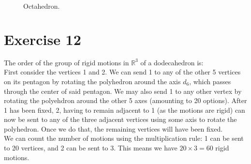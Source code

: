 \documentclass[12pt]{article}
\newcommand{\R}{\mathbb{R}}
\begin{document}
\begin{figure}[H]

        \caption{\label{fig:figure1} Octahedron.}
    \end{figure}


    \section*{Exercise 12}
    The order of the group of rigid motions in $\R^3$ of a dodecahedron is: \\
    First consider the vertices 1 and 2.
    We can send 1 to any of the other 5 vertices on its pentagon by
    rotating the polyhedron around the axis $d_6$, which passes through
    the center of said pentagon. We may also send 1 to any other vertex
    by rotating the polyehdron around the other 5 axes (amounting to 20 
    options).
    After 1 has been fixed, 2, having to remain adjacent to 1 (as the
    motions are rigid) can now be sent to any of the three adjacent vertices
    using some axis to rotate the polyhedron. Once we do that, the
    remaining vertices will have been fixed. \\
    We can count the number of motions using the multiplication rule:
    1 can be sent to 20 vertices, and 2 can be sent to 3. This means we
    have $20 \times 3 = 60$ rigid motions. 
\end{document}
